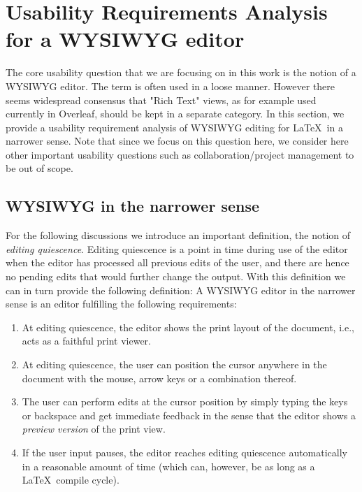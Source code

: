 \documentclass[sigconf]{acmart}
\begin{document}


\section{Usability Requirements Analysis for a WYSIWYG editor} \label{sect:usability}
The core usability question that we are focusing on in this work is the notion of a WYSIWYG editor. 
The term is often used in a loose manner. However there seems widespread consensus that "Rich Text" views, as for example used currently in Overleaf, should be kept in a separate category. 
In this section, we provide a usability requirement analysis of WYSIWYG editing for \LaTeX\ in a narrower sense.
Note that since we focus on this question here, we consider here other important usability questions such as collaboration/project management to be out of scope.
 
\subsection{WYSIWYG in the narrower sense} \label{sect:wysiwyg}
For the following discussions we introduce an important definition, the notion of \emph{editing quiescence}. 
Editing quiescence is a point in time during use of the editor when the editor has processed all previous edits of the user, and there are hence no pending edits that would further change the output. 
With this definition we can in turn provide the following definition:
A WYSIWYG editor in the narrower sense is an editor fulfilling the following requirements: 
\begin{enumerate}
\item At editing quiescence, the editor shows the print layout of the document, i.e., acts as a faithful print viewer. 
\item At editing quiescence, the user can position the cursor anywhere in the document with the mouse, arrow keys or a combination thereof.
\item The user can perform edits at the cursor position by simply typing the keys or backspace and get immediate feedback in the sense that the editor shows a \textit{preview version} of the print view. 
\item If the user input pauses, the editor reaches editing quiescence automatically in a reasonable amount of time (which can, however, be as long as a \LaTeX\ compile cycle). 
\end{enumerate}
\end{document}
